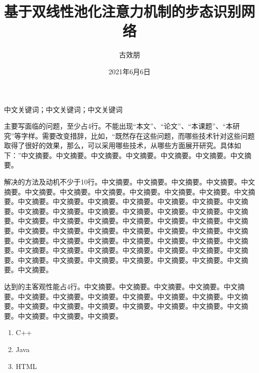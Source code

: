 \documentclass[supercite]{HustGraduPaper}
\title{基于双线性池化注意力机制的步态识别网络}
\author{古效朋}
\date{2021年6月6日}
\theoremstyle{definition}
\begin{document}
\maketitle

\statement

\clearpage


\begin{cnabstract}{中文关键词；中文关键词；中文关键词}

主要写面临的问题，至少占4行。不能出现``本文''、``论文''、``本课题''、``本研究''等字样。需要改变措辞，比如，``既然存在这些问题，而哪些技术针对这些问题取得了很好的效果，那么，可以采用哪些技术，从哪些方面展开研究。具体如下：''中文摘要。中文摘要。中文摘要。中文摘要。中文摘要。中文摘要。中文摘要。

解决的方法及动机不少于10行。中文摘要。中文摘要。中文摘要。中文摘要。中文摘要。中文摘要。中文摘要。中文摘要。中文摘要。中文摘要。中文摘要。中文摘要。中文摘要。中文摘要。中文摘要。中文摘要。中文摘要。中文摘要。中文摘要。中文摘要。中文摘要。中文摘要。中文摘要。中文摘要。中文摘要。中文摘要。中文摘要。中文摘要。中文摘要。中文摘要。中文摘要。中文摘要。中文摘要。中文摘要。中文摘要。中文摘要。中文摘要。中文摘要。中文摘要。中文摘要。中文摘要。中文摘要。中文摘要。中文摘要。中文摘要。中文摘要。中文摘要。中文摘要。中文摘要。中文摘要。中文摘要。中文摘要。中文摘要。中文摘要。中文摘要。中文摘要。中文摘要。中文摘要。中文摘要。中文摘要。中文摘要。中文摘要。

达到的主客观性能占4行。中文摘要。中文摘要。中文摘要。中文摘要。中文摘要。中文摘要。中文摘要。中文摘要。中文摘要。中文摘要。中文摘要。中文摘要。中文摘要。中文摘要。中文摘要。中文摘要。中文摘要。中文摘要。中文摘要。中文摘要。中文摘要。中文摘要。

\begin{enumerate}
	\renewcommand{\labelenumi}{\theenumi)}
	\item C++
	\item Java
	\item HTML
\end{enumerate}

\end{cnabstract}
\end{document}
